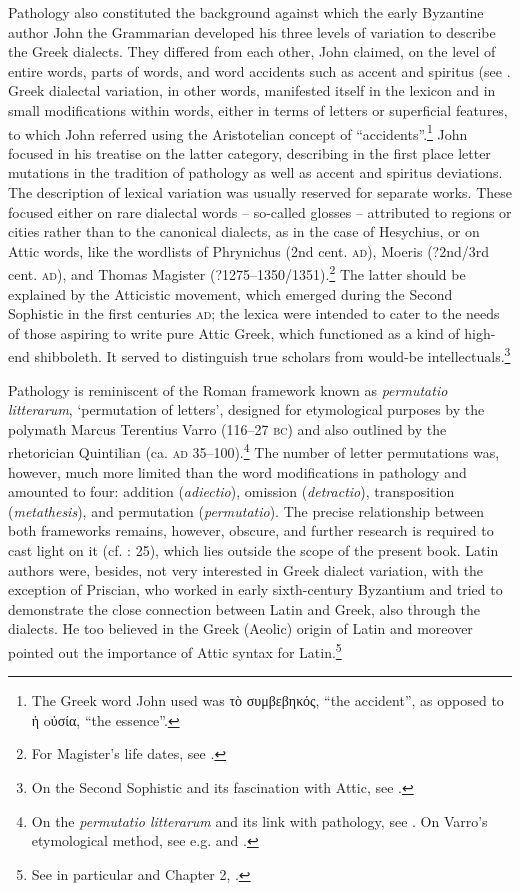Pathology also constituted the background against which the early Byzantine author John the Grammarian developed his three levels of variation to describe the Greek dialects. They differed from each other, John claimed, on the level of entire words, parts of words, and word accidents such as accent and spiritus (see \citet[237\textsc{\textsuperscript{r}}]{Manutius1496}. Greek dialectal variation, in other words, manifested itself in the lexicon and in small modifications within words, either in terms of letters or superficial features, to which John referred using the Aristotelian concept of “accidents”.\footnote{The Greek word John used was τὸ συμβεβηκός, “the accident”, as opposed to ἡ oὐσία, “the essence”.} John focused in his treatise on the latter category, describing in the first place letter mutations in the tradition of pathology as well as accent and spiritus deviations. The description of lexical variation was usually reserved for separate works. These focused either on rare dialectal words – so-called glosses – attributed to regions or cities rather than to the canonical dialects, as in the case of Hesychius, or on Attic words, like the wordlists of Phrynichus (2nd cent. \textsc{ad}), Moeris (?2nd/3rd cent. \textsc{ad}), and Thomas Magister (?1275–1350/1351).\footnote{{For Magister’s life dates, see \citet[417]{Baloglou1998}.}} The latter should be explained by the Atticistic movement, which emerged during the Second Sophistic in the first centuries \textsc{ad}; the lexica were intended to cater to the needs of those aspiring to write pure Attic Greek, which functioned as a kind of high-end shibboleth. It served to distinguish true scholars from would-be intellectuals.\footnote{On the Second Sophistic and its fascination with Attic, see \citet{Whitmarsh2005}.}



Pathology is reminiscent of the Roman framework known as \textit{permutatio litterarum}, ‘permutation of letters’, designed for etymological purposes by the polymath Marcus Terentius Varro (116–27 \textsc{bc}) and also outlined by the rhetorician Quintilian (ca. \textsc{ad} 35–100).\footnote{{On the} {\textit{permutatio litterarum} }{and its link with pathology, see \citet[esp. 25–28, 37]{Ax1987}. On Varro’s etymological method, see e.g. \citet{Pfaffel1981} and \citet[7-10{\textit{passim}}]{Taylor1996}.}} The number of letter permutations was, however, much more limited than the word modifications in pathology and amounted to four: addition (\textit{adiectio}), omission (\textit{detractio}), transposition (\textit{metathesis}), and permutation (\textit{permutatio}). The precise relationship between both frameworks remains, however, obscure, and further research is required to cast light on it (cf. \citealt{Ax1987}: 25), which lies outside the scope of the present book. Latin authors were, besides, not very interested in Greek dialect variation, with the exception of Priscian, who worked in early sixth-century Byzantium and tried to demonstrate the close connection between Latin and Greek, also through the dialects. He too believed in the Greek (Aeolic) origin of Latin and moreover pointed out the importance of Attic syntax for Latin.\footnote{{See in particular \citet[]{Conduche_latin_nodate} and Chapter 2, .}}


